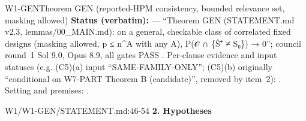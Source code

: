 \begin{card}{W1-GEN}{Theorem GEN (reported-HPM consistency, bounded relevance set, masking allowed)}
\textbf{Status (verbatim):}  — ``Theorem GEN (STATEMENT.md v2.3, lemmas/00\_MAIN.md): on a general, checkable class of correlated fixed designs (masking allowed, p ≤ n\textasciicircum{}A with any A), P(𝒪 ∩ \{Ŝ⁺ ≠ S₀\}) → 0''; council round~1 Sol 9.0, Opus 8.9, all gates PASS . Per-clause evidence and input statuses (e.g. (C5)(a) input ``SAME-FAMILY-ONLY''; (C5)(b) originally ``conditional on W7-PART Theorem B (candidate)'', removed by  item~2): . Setting and premises: .
\begin{stmt}{W1/W1-GEN/STATEMENT.md:46-54}
\textbf{2. Hypotheses}


\end{stmt}
\end{card}
